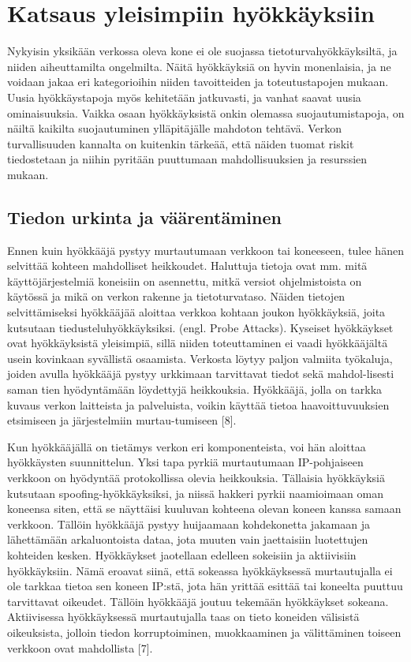 
\chapter{Katsaus yleisimpiin hyökkäyksiin}
Nykyisin yksikään verkossa oleva kone ei ole suojassa tietoturvahyökkäyksiltä,
ja niiden aiheuttamilta ongelmilta. Näitä hyökkäyksiä on hyvin monenlaisia, ja
ne voidaan jakaa eri kategorioihin niiden tavoitteiden ja toteutustapojen
mukaan. Uusia hyökkäystapoja myös kehitetään jatkuvasti, ja vanhat saavat uusia
ominaisuuksia. Vaikka osaan hyökkäyksistä onkin olemassa suojautumistapoja, on
näiltä kaikilta suojautuminen ylläpitäjälle mahdoton tehtävä. Verkon
turvallisuuden kannalta on kuitenkin tärkeää, että näiden tuomat riskit
tiedostetaan ja niihin pyritään puuttumaan mahdollisuuksien ja resurssien
mukaan.

\section{Tiedon urkinta ja väärentäminen}

Ennen kuin hyökkääjä pystyy murtautumaan verkkoon tai koneeseen, tulee hänen
selvittää kohteen mahdolliset heikkoudet. Haluttuja tietoja ovat mm. mitä
käyttöjärjestelmiä koneisiin on asennettu, mitkä versiot ohjelmistoista on
käytössä ja mikä on verkon rakenne ja tietoturvataso. Näiden tietojen
selvittämiseksi hyökkääjää aloittaa verkkoa kohtaan joukon hyökkäyksiä, joita
kutsutaan tiedusteluhyökkäyksiksi. (engl. Probe Attacks). Kyseiset hyökkäykset
ovat hyökkäyksistä yleisimpiä, sillä niiden toteuttaminen ei vaadi hyökkääjältä
usein kovinkaan syvällistä osaamista. Verkosta löytyy paljon valmiita työkaluja,
joiden avulla hyökkääjä pystyy urkkimaan tarvittavat tiedot sekä mahdol-lisesti
saman tien hyödyntämään löydettyjä heikkouksia. Hyökkääjä, jolla on tarkka
kuvaus verkon laitteista ja palveluista, voikin käyttää tietoa
haavoittuvuuksien etsimiseen ja järjestelmiin murtau-tumiseen [8].

Kun hyökkääjällä on tietämys verkon eri komponenteista, voi hän aloittaa
hyökkäysten suunnittelun. Yksi tapa pyrkiä murtautumaan IP-pohjaiseen verkkoon
on hyödyntää protokollissa olevia heikkouksia. Tällaisia hyökkäyksiä kutsutaan
spoofing-hyökkäyksiksi, ja niissä hakkeri pyrkii naamioimaan oman koneensa
siten, että se näyttäisi kuuluvan kohteena olevan koneen kanssa samaan verkkoon.
Tällöin hyökkääjä pystyy huijaamaan kohdekonetta jakamaan ja lähettämään
arkaluontoista dataa, jota muuten vain jaettaisiin luotettujen kohteiden kesken.
Hyökkäykset jaotellaan edelleen sokeisiin ja aktiivisiin hyökkäyksiin. Nämä
eroavat siinä, että sokeassa hyökkäyksessä murtautujalla ei ole tarkkaa tietoa
sen koneen IP:stä, jota hän yrittää esittää tai koneelta puuttuu tarvittavat
oikeudet. Tällöin hyökkääjä joutuu tekemään hyökkäykset sokeana. Aktiivisessa
hyökkäyksessä murtautujalla taas on tieto koneiden välisistä oikeuksista,
jolloin tiedon korruptoiminen, muokkaaminen ja välittäminen toiseen verkkoon
ovat mahdollista [7].

